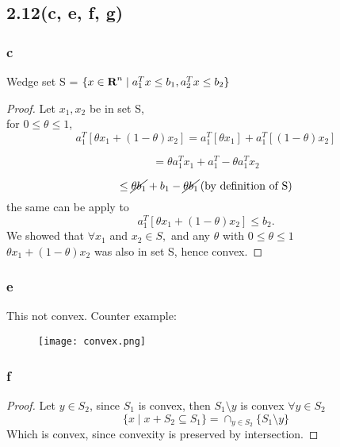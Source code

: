 \documentclass{article}
\newcommand{\reals}{{\mbox{\bf R}}}
\begin{document}
\subsection*{2.12(c, e, f, g)}
\subsubsection*{c}
Wedge set S  =  $\{ x \in \reals^{n} \mid a^{T}_1 x \le b_1, a^{T}_2 x \le b_2\}$
\begin{proof}
Let $x_1, x_2$ be in set S,\\
for $0 \leq \theta \leq 1$,\\
\[a^{T}_1[\theta x_1 + (1-\theta)x_2 ] = a^{T}_1[\theta x_1]  + a^{T}_1[ (1-\theta)x_2] \]

\[  = \theta a^T_1 x_1 + a^T_1 - \theta a^T_1x_2 \]

\[ \le \cancel{\theta b_1} + b_1 - \cancel{\theta b_1}\, (\mbox{by definition of S})\]
the same can be apply to
\[a^{T}_1[\theta x_1 + (1-\theta)x_2 ]  \le b_2.\]
We showed that  $\forall x_1$ and $x_2 \in S,$ and any  $\theta$ with $0 \leq \theta \le 1$\\
$\theta x_1 + (1-\theta) x_2$ was also in set S, hence convex.
\end{proof}
\subsubsection*{e}
This not convex.
Counter example:
\begin{figure}[h]
\begin{center}
  \texttt{[image: convex.png]}
\end{center}
\end{figure}
\subsubsection*{f}
\begin{proof}
Let $y \in S_2$, since $S_1$ is convex, then $S_1\setminus y$ is convex $\forall y \in S_2$
\[ \{x \mid  x  + S_2 \subseteq  S_1\}  =\cap_{y \in S_2} \{S_1 \setminus  y \}\]
Which is convex, since convexity is preserved by intersection.
\end{proof}
\end{document}
